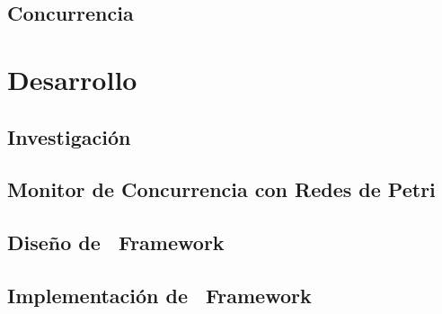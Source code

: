 \documentclass{report}
\begin{document}
        \chapter{Concurrencia}
            

    \part{Desarrollo}
        \chapter{Investigación}
            
        \chapter{Monitor de Concurrencia con Redes de Petri}
            
        \chapter{Diseño de \nombreFramework \  Framework}
            
            
            
            
            
        \chapter{Implementación de \nombreFramework \  Framework}
        	
    
	
\end{document}
